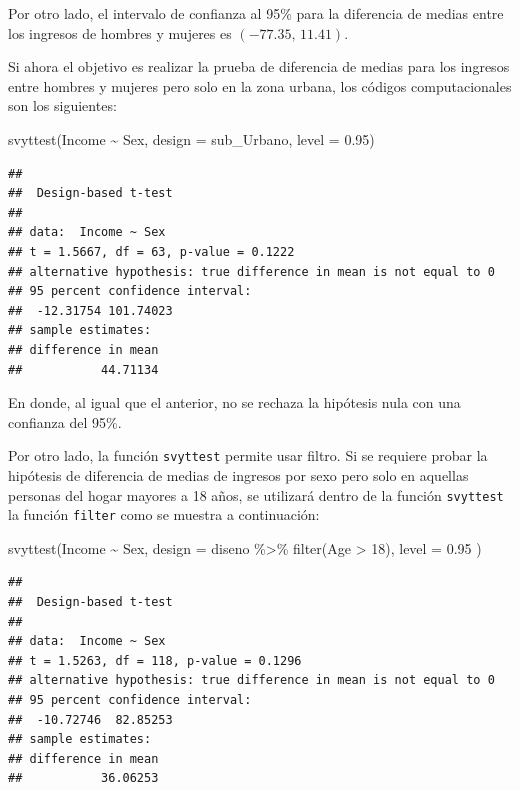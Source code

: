 \documentclass[
  12pt,
]{book}
\newenvironment{Shaded}{\begin{snugshade}}{\end{snugshade}}
\newcommand{\AttributeTok}[1]{\textcolor[rgb]{0.77,0.63,0.00}{#1}}
\newcommand{\DecValTok}[1]{\textcolor[rgb]{0.00,0.00,0.81}{#1}}
\newcommand{\FloatTok}[1]{\textcolor[rgb]{0.00,0.00,0.81}{#1}}
\newcommand{\FunctionTok}[1]{\textcolor[rgb]{0.00,0.00,0.00}{#1}}
\newcommand{\NormalTok}[1]{#1}
\newcommand{\SpecialCharTok}[1]{\textcolor[rgb]{0.00,0.00,0.00}{#1}}
\begin{document}
Por otro lado, el intervalo de confianza al 95\% para la diferencia de medias entre los ingresos de hombres y mujeres es \(\left(-77.35,\,11.41\right)\).

Si ahora el objetivo es realizar la prueba de diferencia de medias para los ingresos entre hombres y mujeres pero solo en la zona urbana, los códigos computacionales son los siguientes:

\begin{Shaded}
\begin{Highlighting}[]
\FunctionTok{svyttest}\NormalTok{(Income }\SpecialCharTok{\textasciitilde{}}\NormalTok{ Sex, }\AttributeTok{design =}\NormalTok{ sub\_Urbano, }\AttributeTok{level =} \FloatTok{0.95}\NormalTok{) }
\end{Highlighting}
\end{Shaded}

\begin{verbatim}
## 
##  Design-based t-test
## 
## data:  Income ~ Sex
## t = 1.5667, df = 63, p-value = 0.1222
## alternative hypothesis: true difference in mean is not equal to 0
## 95 percent confidence interval:
##  -12.31754 101.74023
## sample estimates:
## difference in mean 
##           44.71134
\end{verbatim}

En donde, al igual que el anterior, no se rechaza la hipótesis nula con una confianza del 95\%.

Por otro lado, la función \texttt{svyttest} permite usar filtro. Si se requiere probar la hipótesis de diferencia de medias de ingresos por sexo pero solo en aquellas personas del hogar mayores a 18 años, se utilizará dentro de la función \texttt{svyttest} la función \texttt{filter} como se muestra a continuación:

\begin{Shaded}
\begin{Highlighting}[]
\FunctionTok{svyttest}\NormalTok{(Income }\SpecialCharTok{\textasciitilde{}}\NormalTok{ Sex, }\AttributeTok{design =}\NormalTok{ diseno }\SpecialCharTok{\%\textgreater{}\%} \FunctionTok{filter}\NormalTok{(Age }\SpecialCharTok{\textgreater{}} \DecValTok{18}\NormalTok{), }\AttributeTok{level =} \FloatTok{0.95}\NormalTok{ )}
\end{Highlighting}
\end{Shaded}

\begin{verbatim}
## 
##  Design-based t-test
## 
## data:  Income ~ Sex
## t = 1.5263, df = 118, p-value = 0.1296
## alternative hypothesis: true difference in mean is not equal to 0
## 95 percent confidence interval:
##  -10.72746  82.85253
## sample estimates:
## difference in mean 
##           36.06253
\end{verbatim}
\end{document}
